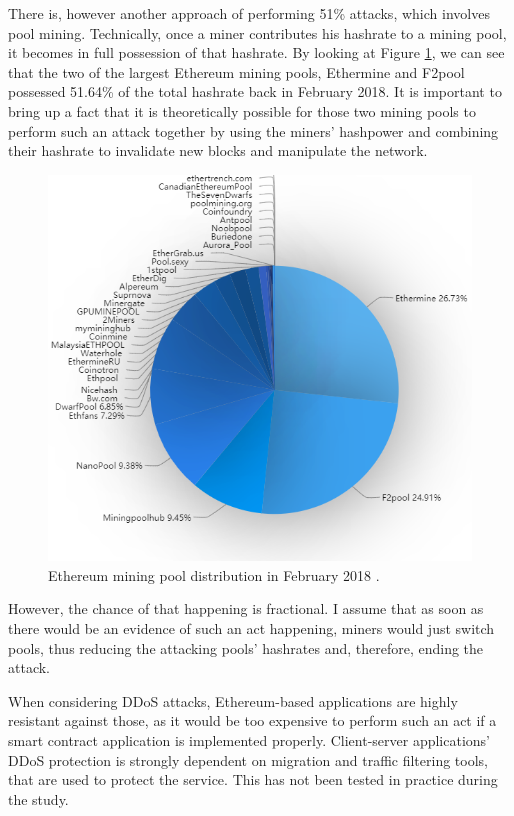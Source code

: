 There is, however another approach of performing 51\% attacks, which involves pool mining. Technically, once a miner contributes his hashrate to a mining pool, it becomes in full possession of that hashrate. By looking at Figure \ref{fig:etherpools}, we can see that the two of the largest Ethereum mining pools, Ethermine and F2pool possessed 51.64\% of the total hashrate back in February 2018. It is important to bring up a fact that it is theoretically possible for those two mining pools to perform such an attack together by using the miners' hashpower and combining their hashrate to invalidate new blocks and manipulate the network.

\begin{figure}[H]
\centering
\includegraphics[scale=0.68]{images/ethpools.png}
\caption{Ethereum mining pool distribution in February 2018 \textnormal{\citep{ethminingpools}}.}
\label{fig:etherpools}
\end{figure}

However, the chance of that happening is fractional. I assume that as soon as there would be an evidence of such an act happening, miners would just switch pools, thus reducing the attacking pools' hashrates and, therefore, ending the attack.

When considering DDoS attacks, Ethereum-based applications are highly resistant against those, as it would be too expensive to perform such an act if a smart contract application is implemented properly. Client-server applications' DDoS protection is strongly dependent on migration and traffic filtering tools, that are used to protect the service. This has not been tested in practice during the study.

